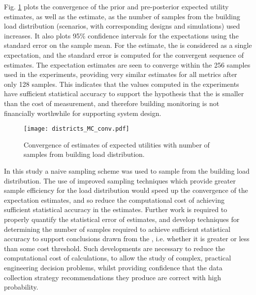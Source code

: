 \begin{subappendices}
    Fig. \ref{fig:districts-MC-convergence} plots the convergence of the prior and pre-posterior expected utility estimates, as well as the  estimate, as the number of samples from the building load distribution (scenarios, with corresponding designs and simulations) used increases. It also plots 95\% confidence intervals for the expectations using the standard error on the sample mean. For the  estimate, the  is considered as a single expectation, and the standard error is computed for the convergent sequence of  estimates. The expectation estimates are seen to converge within the 256 samples used in the experiments, providing very similar estimates for all metrics after only 128 samples. This indicates that the  values computed in the experiments have sufficient statistical accuracy to support the hypothesis that the  is smaller than the cost of measurement, and therefore building monitoring is not financially worthwhile for supporting system design.

    \begin{figure}[h] %
        \centering
        \texttt{[image: districts\_MC\_conv.pdf]}
        \caption{Convergence of  estimates of expected utilities with number of samples from building load distribution.}
        \label{fig:districts-MC-convergence}
    \end{figure}

    In this study a naive sampling scheme was used to sample from the building load distribution. The use of improved sampling techniques which provide greater sample efficiency for the load distribution would speed up the convergence of the expectation estimates, and so reduce the computational cost of achieving sufficient statistical accuracy in the  estimates. Further work is required to properly quantify the statistical error of  estimates, and develop techniques for determining the number of samples required to achieve sufficient statistical accuracy to support conclusions drawn from the , i.e. whether it is greater or less than some cost threshold. Such developments are necessary to reduce the computational cost of  calculations, to allow the study of complex, practical engineering decision problems, whilst providing confidence that the data collection strategy recommendations they produce are correct with high probability.


\end{subappendices}
